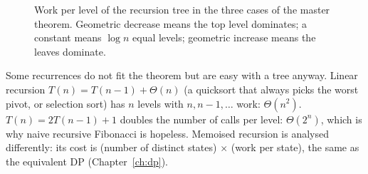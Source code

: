 \begin{figure}[htbp]
\centering
{}
\caption{Work per level of the recursion tree in the three cases of the master theorem. Geometric decrease means the top
level dominates; a constant means $\log n$ equal levels; geometric increase means the leaves dominate.}
\label{fig:master}
\end{figure}

Some recurrences do not fit the theorem but are easy with a tree anyway. Linear recursion $T(n) = T(n-1) + \Theta(n)$ (a
quicksort that always picks the worst pivot, or selection sort) has $n$ levels with $n, n-1, \dots$ work: $\Theta(n^2)$.
$T(n) = 2T(n-1) + 1$ doubles the number of calls per level: $\Theta(2^n)$, which is why naive recursive Fibonacci is
hopeless. Memoised recursion is analysed differently: its cost is (number of distinct states) $\times$ (work per state),
the same as the equivalent DP (Chapter~\ref{ch:dp}).

